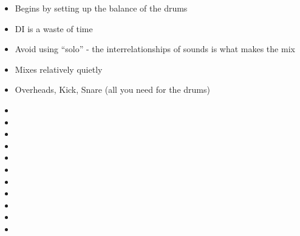 \documentclass{article}
\begin{document}
\begin{itemize}
\item Begins by setting up the balance of the drums
\item DI is a waste of time
\item Avoid using ``solo'' - the interrelationships of sounds is what makes the mix
\item Mixes relatively quietly 
\item Overheads, Kick, Snare (all you need for the drums)
\item 
\item 
\item 
\item 
\item
\item 
\item 
\item 
\item 
\item 
\item
\end{itemize}
\end{document}
